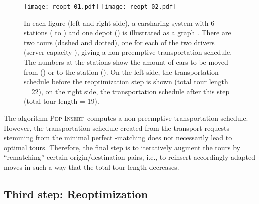 \documentclass[english]{llncs}
\numberwithin{sublemma}{lemma}
\newcommand{\PDPINSERT}{\textsc{Pdp-Insert}\xspace}
\begin{document}
\begin{figure}[ht]
    \centering
\texttt{[image: reopt-01.pdf]}  \texttt{[image: reopt-02.pdf]}
 \caption{
          In each figure (left and right side), a carsharing system with 6 stations ( to ) and one depot () is illustrated as a graph .
          There are two tours (dashed and dotted), one for each of the two drivers (server capacity ), giving a non-preemptive transportation schedule.
          The numbers at the stations show the amount of cars to be moved from () or to the station ().
          On the left side, the transportation schedule before the reoptimization step is shown (total tour length = 22), on the right side, the transportation schedule after this step (total tour length = 19).
 }
 \label{fig: reopt}
\end{figure}



The algorithm \PDPINSERT\ computes a non-preemptive transportation schedule. 
However, the transportation schedule created from the transport requests stemming from the minimal perfect -matching does not necessarily lead to optimal tours.
Therefore, the final step is to iteratively augment the tours by ``rematching'' certain origin/destination pairs,
i.e., to reinsert accordingly adapted moves in such a way that the total tour length decreases.




\subsection{Third step: Reoptimization}
\end{document}
